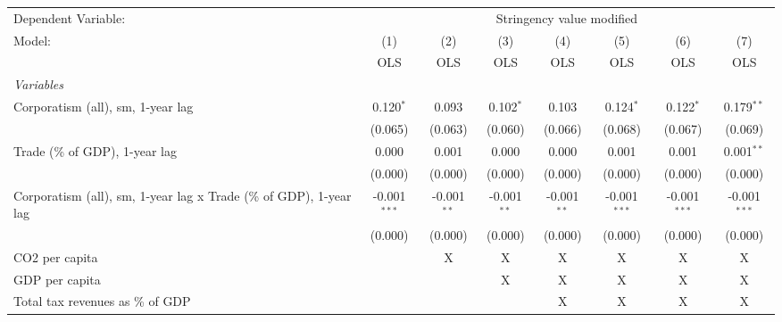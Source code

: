 
\begingroup
\centering
\begin{tabular}{lccccccc}
   \toprule
   Dependent Variable: & \multicolumn{7}{c}{Stringency value modified}\\
   Model:                                                             & (1)            & (2)           & (3)           & (4)           & (5)            & (6)            & (7)\\  
                                                                      &  OLS           & OLS           & OLS           & OLS           & OLS            & OLS            & OLS\\  
   \midrule
   \emph{Variables}\\
   Corporatism (all), sm, 1-year lag                                  & 0.120$^{*}$    & 0.093         & 0.102$^{*}$   & 0.103         & 0.124$^{*}$    & 0.122$^{*}$    & 0.179$^{**}$\\   
                                                                      & (0.065)        & (0.063)       & (0.060)       & (0.066)       & (0.068)        & (0.067)        & (0.069)\\   
   Trade (\% of GDP), 1-year lag                                      & 0.000          & 0.001         & 0.000         & 0.000         & 0.001          & 0.001          & 0.001$^{**}$\\   
                                                                      & (0.000)        & (0.000)       & (0.000)       & (0.000)       & (0.000)        & (0.000)        & (0.000)\\   
   Corporatism (all), sm, 1-year lag x Trade (\% of GDP), 1-year lag  & -0.001$^{***}$ & -0.001$^{**}$ & -0.001$^{**}$ & -0.001$^{**}$ & -0.001$^{***}$ & -0.001$^{***}$ & -0.001$^{***}$\\   
                                                                      & (0.000)        & (0.000)       & (0.000)       & (0.000)       & (0.000)        & (0.000)        & (0.000)\\   
   CO2 per capita                                                     &                & X             & X             & X             & X              & X              & X\\  
   GDP per capita                                                     &                &               & X             & X             & X              & X              & X\\  
   Total tax revenues as \% of GDP                                    &                &               &               & X             & X              & X              & X\\  

\end{tabular}
